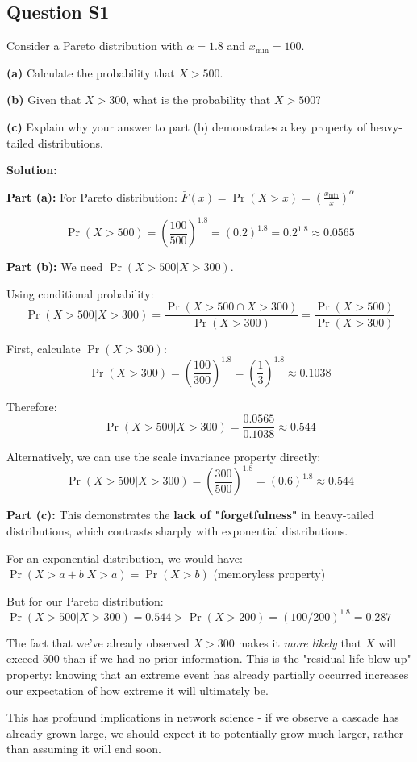 \documentclass[11pt]{article}
\newenvironment{solution}
{\color{solutioncolor}\begin{framed}\textbf{Solution:}\par}
{\end{framed}}
\begin{document}
\subsection{Question S1}
Consider a Pareto distribution with $\alpha = 1.8$ and $x_{\min} = 100$.

\textbf{(a)} Calculate the probability that $X > 500$.

\textbf{(b)} Given that $X > 300$, what is the probability that $X > 500$?

\textbf{(c)} Explain why your answer to part (b) demonstrates a key property of heavy-tailed distributions.

\begin{solution}
\textbf{Part (a):}
For Pareto distribution: $\bar{F}(x) = \Pr(X > x) = \left(\frac{x_{\min}}{x}\right)^{\alpha}$

$$\Pr(X > 500) = \left(\frac{100}{500}\right)^{1.8} = (0.2)^{1.8} = 0.2^{1.8} \approx 0.0565$$

\textbf{Part (b):}
We need $\Pr(X > 500 | X > 300)$.

Using conditional probability:
$$\Pr(X > 500 | X > 300) = \frac{\Pr(X > 500 \cap X > 300)}{\Pr(X > 300)} = \frac{\Pr(X > 500)}{\Pr(X > 300)}$$

First, calculate $\Pr(X > 300)$:
$$\Pr(X > 300) = \left(\frac{100}{300}\right)^{1.8} = \left(\frac{1}{3}\right)^{1.8} \approx 0.1038$$

Therefore:
$$\Pr(X > 500 | X > 300) = \frac{0.0565}{0.1038} \approx 0.544$$

Alternatively, we can use the scale invariance property directly:
$$\Pr(X > 500 | X > 300) = \left(\frac{300}{500}\right)^{1.8} = (0.6)^{1.8} \approx 0.544$$

\textbf{Part (c):}
This demonstrates the \textbf{lack of "forgetfulness"} in heavy-tailed distributions, which contrasts sharply with exponential distributions.

For an exponential distribution, we would have:
$\Pr(X > a + b | X > a) = \Pr(X > b)$ (memoryless property)

But for our Pareto distribution:
$\Pr(X > 500 | X > 300) = 0.544 > \Pr(X > 200) = (100/200)^{1.8} = 0.287$

The fact that we've already observed $X > 300$ makes it \textit{more likely} that $X$ will exceed 500 than if we had no prior information. This is the "residual life blow-up" property: knowing that an extreme event has already partially occurred increases our expectation of how extreme it will ultimately be.

This has profound implications in network science - if we observe a cascade has already grown large, we should expect it to potentially grow much larger, rather than assuming it will end soon.
\end{solution}
\end{document}
